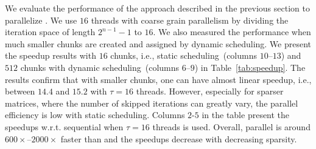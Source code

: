 \documentclass{elektr}
\begin{document}
{\begin{table}[!htbp]
\centering
{}
 \vspace*{1ex}
 \caption{Pairwise performance comparison of the algorithms for $n = 32$. For each row, the performances are normalized w.r.t. to the algorithm whose name is given 
 in the leftmost column at that row. Each value in the table is the average of normalized execution times for $20$ different executions since we have four different $p$ values and five matrices for each $p$.}
 \label{tab:all}
 \end{table}
   
We evaluate the performance of the approach described in the previous section to parallelize {}. We use $16$ threads with coarse grain parallelism by dividing the iteration space of length $2^{n-1} - 1$ to $16$. We also measured the performance when much smaller chunks are created and assigned by dynamic scheduling. We present the speedup results with $16$ chunks, i.e., static scheduling~(columns $10$--$13$) and $512$ chunks with dynamic scheduling~(columns $6$--$9$) in Table~\ref{tab:speedup}. The results confirm that with smaller chunks, one can have almost linear speedup, i.e., between $14.4$ and $15.2$ with $\tau = 16$ threads. However, especially for sparser matrices, where the number of skipped iterations can greatly vary, the parallel efficiency is low with static scheduling. Columns $2$-$5$ in the table present the speedups w.r.t. sequential {} when $\tau = 16$ threads is used. Overall, parallel {} is around $600\times$--$2000\times$ faster than{} and the speedups decrease with decreasing sparsity.  
 
}
\end{document}
